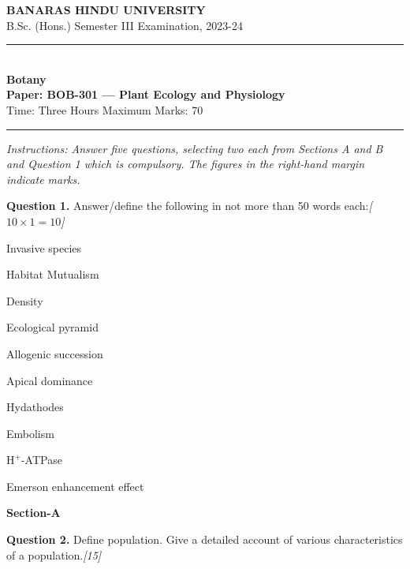 \documentclass[11pt,a4paper]{article}
\newcommand{\pts}[1]{\hfill   \textit{[#1]}}
\begin{document}
\begin{center}
  {\large\bfseries BANARAS HINDU UNIVERSITY}\\[2pt]
  {\normalsize B.Sc. (Hons.) Semester III Examination, 2023-24}\\[6pt]
  \rule{0.8\linewidth}{0.5pt}\\[6pt]
  {\large\bfseries Botany}\\[4pt]
  {\large\bfseries Paper: BOB-301 --- Plant Ecology and Physiology}\\[4pt]
  {\normalsize Time: Three Hours \hfill Maximum Marks: 70}
\end{center}

\rule{\linewidth}{0.4pt}

\smallskip



\noindent   \textit{Instructions: Answer five questions, selecting two each from Sections A and B and Question 1 which is compulsory. The figures in the right-hand margin indicate marks.}

\bigskip

\medskip


\noindent   \textbf{Question 1.} Answer/define the following in not more than 50 words each:\pts{$10  \times 1 = 10$}

\begin{parts}
  \item Invasive species
  \item Habitat Mutualism
  \item Density
  \item Ecological pyramid
  \item Allogenic succession
  \item Apical dominance
  \item Hydathodes
  \item Embolism
  \item $ \text{H}^+$-ATPase
  \item Emerson enhancement effect
\end{parts}

\bigskip

\begin{center}
   \textbf{Section-A}
\end{center}
\medskip

\medskip


\noindent   \textbf{Question 2.} Define population. Give a detailed account of various characteristics of a population.\pts{15}

\medskip
\end{document}
